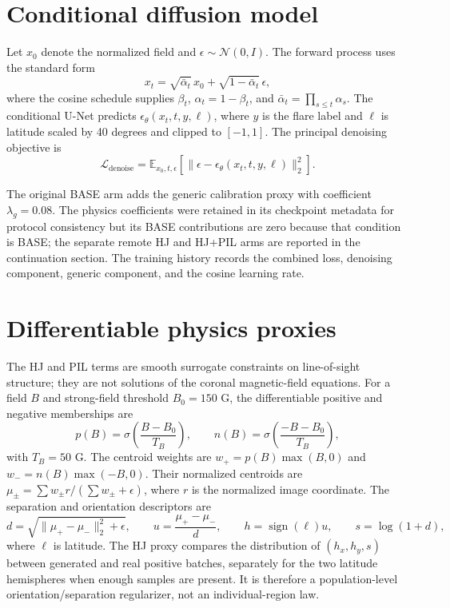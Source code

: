 \documentclass[11pt,oneside]{report}
\begin{document}
\section{Conditional diffusion model}

Let $x_0$ denote the normalized field and $\epsilon\sim\mathcal{N}(0,I)$. The forward process uses the standard form
\begin{equation}
  x_t = \sqrt{\bar\alpha_t}\,x_0 + \sqrt{1-\bar\alpha_t}\,\epsilon,
\end{equation}
where the cosine schedule supplies $\beta_t$, $\alpha_t=1-\beta_t$, and $\bar\alpha_t=\prod_{s\leq t}\alpha_s$. The conditional U-Net predicts $\epsilon_\theta(x_t,t,y,\ell)$, where $y$ is the flare label and $\ell$ is latitude scaled by 40 degrees and clipped to $[-1,1]$. The principal denoising objective is
\begin{equation}
  \mathcal{L}_{\mathrm{denoise}} = \mathbb{E}_{x_0,t,\epsilon}\left[\|\epsilon-\epsilon_\theta(x_t,t,y,\ell)\|_2^2\right].
\end{equation}

The original BASE arm adds the generic calibration proxy with coefficient $\lambda_g=0.08$. The physics coefficients were retained in its checkpoint metadata for protocol consistency but its BASE contributions are zero because that condition is BASE; the separate remote HJ and HJ+PIL arms are reported in the continuation section. The training history records the combined loss, denoising component, generic component, and the cosine learning rate.

\section{Differentiable physics proxies}

The HJ and PIL terms are smooth surrogate constraints on line-of-sight structure; they are not solutions of the coronal magnetic-field equations. For a field $B$ and strong-field threshold $B_0=150$ G, the differentiable positive and negative memberships are
\begin{equation}
  p(B)=\sigma\left(\frac{B-B_0}{T_B}\right), \qquad
  n(B)=\sigma\left(\frac{-B-B_0}{T_B}\right),
\end{equation}
with $T_B=50$ G. The centroid weights are $w_+=p(B)\max(B,0)$ and $w_-=n(B)\max(-B,0)$. Their normalized centroids are $\mu_\pm=\sum w_\pm r/(\sum w_\pm+\epsilon)$, where $r$ is the normalized image coordinate. The separation and orientation descriptors are
\begin{equation}
  d=\sqrt{\|\mu_+-\mu_-\|_2^2+\epsilon}, \qquad
  u=\frac{\mu_+-\mu_-}{d}, \qquad
  h=\operatorname{sign}(\ell)u, \qquad s=\log(1+d),
\end{equation}
where $\ell$ is latitude. The HJ proxy compares the distribution of $(h_x,h_y,s)$ between generated and real positive batches, separately for the two latitude hemispheres when enough samples are present. It is therefore a population-level orientation/separation regularizer, not an individual-region law.
\end{document}
